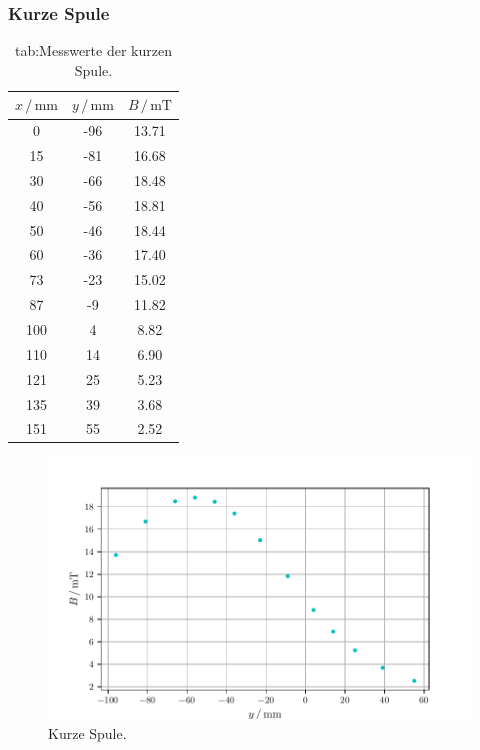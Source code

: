     \subsubsection{Kurze Spule}
    \begin{table}
    \centering
    \caption{tab:Messwerte der kurzen Spule.}
    \label{tab:kurzSp}
        \begin{tabular}{S[table-format=3.0] S[table-format=2.0] S[table-format=2.2]}
            \toprule
            {$x\,/\,\mathrm{mm}$} & {$y\,/\,\mathrm{mm}$} & {$B\,/\,\mathrm{mT}$}\\
               & -96   & 13.71 \\
            15  & -81   & 16.68 \\
            30  & -66   & 18.48 \\
            40  & -56   & 18.81 \\
            50  & -46   & 18.44 \\
            60  & -36   & 17.40 \\
            73  & -23   & 15.02 \\
            87  & -9    & 11.82 \\
            100 & 4     & 8.82  \\
            110 & 14    & 6.90  \\
            121 & 25    & 5.23  \\
            135 & 39    & 3.68  \\
            151 & 55    & 2.52  \\
            \bottomrule
        \end{tabular}
    \end{table}
    \begin{figure}
        \centering
        \includegraphics[width=\textwidth]{Plots/plot_kurzSp.pdf}
        \caption{Kurze Spule.}
        \label{fig:kurz}
    \end{figure}
    \pagebreak
